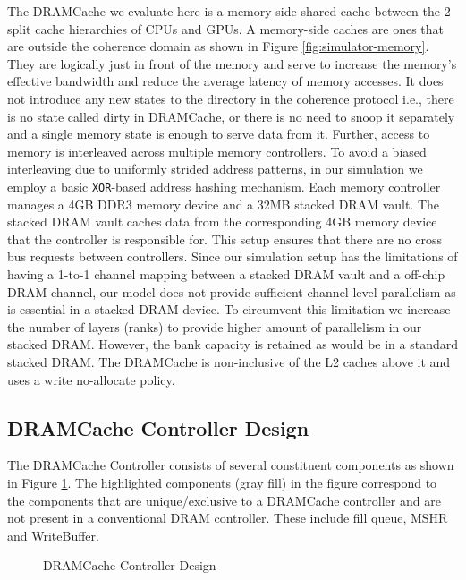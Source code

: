 \par The DRAMCache we evaluate here is a memory-side \cite{skylake,mainak-hpca} shared cache between the 2 split cache hierarchies of CPUs and GPUs. A memory-side caches are ones that are outside the coherence domain as shown in Figure \ref{fig:simulator-memory}. They are logically just in front of the memory and serve to increase the memory's effective bandwidth and reduce the average latency of memory accesses. It does not introduce any new states to the directory in the coherence protocol i.e., there is no state called dirty in DRAMCache, or there is no need to snoop it separately and a single memory state is enough to serve data from it. Further, access to memory is interleaved across multiple memory controllers. To avoid a biased interleaving due to uniformly strided address patterns, in our simulation we employ a basic {\tt XOR}-based address hashing mechanism. Each memory controller manages a 4GB DDR3 memory device and a 32MB stacked DRAM vault. The stacked DRAM vault caches data from the corresponding 4GB memory device that the controller is responsible for. This setup ensures that there are no cross bus requests between controllers. Since our simulation setup has the limitations of having a 1-to-1 channel mapping between a stacked DRAM vault and a off-chip DRAM channel, our model does not provide sufficient channel level parallelism as is essential in a stacked DRAM device. To circumvent this limitation we increase the number of layers (ranks) to provide higher amount of parallelism in our stacked DRAM. However, the bank capacity is retained as would be in a standard stacked DRAM. The DRAMCache is non-inclusive  \cite{coherence-dramcache} of the L2 caches above it and uses a write no-allocate policy. 

\subsection{DRAMCache Controller Design}
The DRAMCache Controller consists of several constituent components as shown in Figure \ref{fig:dramcache-ctrl}. The highlighted components (gray fill) in the figure correspond to the components that are unique/exclusive to a DRAMCache controller and are not present in a conventional DRAM controller. These include fill queue, MSHR and WriteBuffer.

\begin{figure}[!htb]
	\centering
	\def\svgwidth{\columnwidth}
	
	\caption{DRAMCache Controller Design}
	\label{fig:dramcache-ctrl}
\end{figure}

